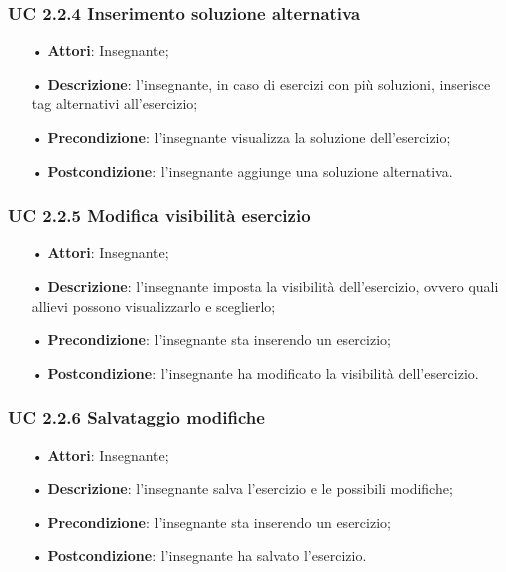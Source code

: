 \subsubsection{UC 2.2.4 Inserimento soluzione alternativa}
\begin{itemize}
	\item[•] \textbf{Attori}: Insegnante;
	\item[•] \textbf{Descrizione}: l'insegnante, in caso di esercizi con più soluzioni, inserisce tag alternativi all’esercizio;
	\item[•] \textbf{Precondizione}: l'insegnante visualizza la soluzione dell'esercizio;
	\item[•] \textbf{Postcondizione}: l'insegnante aggiunge una soluzione alternativa.
\end{itemize}

\subsubsection{UC 2.2.5 Modifica visibilità esercizio}
\begin{itemize}
	\item[•] \textbf{Attori}: Insegnante;
	\item[•] \textbf{Descrizione}: l'insegnante imposta la visibilità dell'esercizio, ovvero quali allievi possono visualizzarlo e sceglierlo;
	\item[•] \textbf{Precondizione}: l'insegnante sta inserendo un esercizio;
	\item[•] \textbf{Postcondizione}: l'insegnante ha modificato la visibilità dell'esercizio.
\end{itemize}
\subsubsection{UC 2.2.6 Salvataggio modifiche}
\begin{itemize}
	\item[•] \textbf{Attori}: Insegnante;
	\item[•] \textbf{Descrizione}: l'insegnante salva l'esercizio e le possibili modifiche;
	\item[•] \textbf{Precondizione}: l'insegnante sta inserendo un esercizio;
	\item[•] \textbf{Postcondizione}: l'insegnante ha salvato l'esercizio.
\end{itemize}
